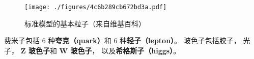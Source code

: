 
\begin{issues}
\issueDraft
\end{issues}

\begin{figure}[ht]
\centering
\texttt{[image: ./figures/4c6b289cb672bd3a.pdf]}
\caption{标准模型的基本粒子（来自维基百科）} \label{fig_BasPar_1}
\end{figure}

费米子包括 6 种\textbf{夸克（quark）}和 6 种\textbf{轻子（lepton）}。 玻色子包括胶子， 光子， \textbf{Z 玻色子}和 \textbf{W 玻色子}， 以及\textbf{希格斯子（higgs）}。
